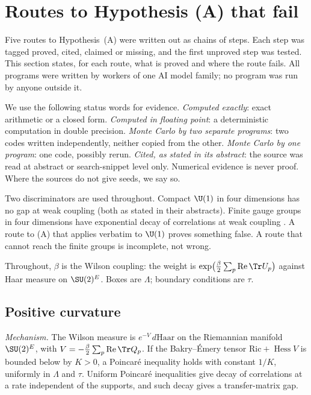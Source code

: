 
\section{Routes to Hypothesis (A) that fail}\label{sec:routes}

Five routes to Hypothesis~(A) were written out as chains of steps. Each step was tagged
proved, cited, claimed or missing, and the first unproved step was tested. This section
states, for each route, what is proved and where the route fails. All programs were written
by workers of one AI model family; no program was run by anyone outside it.

We use the following status words for evidence. \emph{Computed exactly}: exact arithmetic or
a closed form. \emph{Computed in floating point}: a deterministic computation in double
precision. \emph{Monte Carlo by two separate programs}: two codes written independently,
neither copied from the other. \emph{Monte Carlo by one program}: one code, possibly rerun.
\emph{Cited, as stated in its abstract}: the source was read at abstract or search-snippet
level only. Numerical evidence is never proof. Where the sources do not give seeds, we say so.

Two discriminators are used throughout. Compact $\U(1)$ in four dimensions has no gap at weak
coupling \cite{Guth80,FS82} (both as stated in their abstracts). Finite gauge groups in four
dimensions have exponential decay of correlations at weak coupling \cite{AC22}. A route to (A)
that applies verbatim to $\U(1)$ proves something false. A route that cannot reach the finite
groups is incomplete, not wrong.

Throughout, $\beta$ is the Wilson coupling: the weight is
$\exp\bigl(\tfrac{\beta}{2}\sum_p \operatorname{Re}\Tr U_p\bigr)$ against Haar measure on
$\SU(2)^E$. Boxes are $\Lambda$; boundary conditions are $\tau$.

\subsection{Positive curvature}\label{neg:sub-curv}

\emph{Mechanism.} The Wilson measure is $e^{-V}\,d\mathrm{Haar}$ on the Riemannian manifold
$\SU(2)^E$, with $V=-\frac{\beta}{2}\sum_p\operatorname{Re}\Tr Q_p$. If the Bakry--\'Emery tensor
$\mathrm{Ric}+\operatorname{Hess}V$ is bounded below by $K>0$, a Poincar\'e inequality holds with
constant $1/K$, uniformly in $\Lambda$ and $\tau$. Uniform Poincar\'e inequalities give decay of
correlations at a rate independent of the supports, and such decay gives a transfer-matrix gap.

